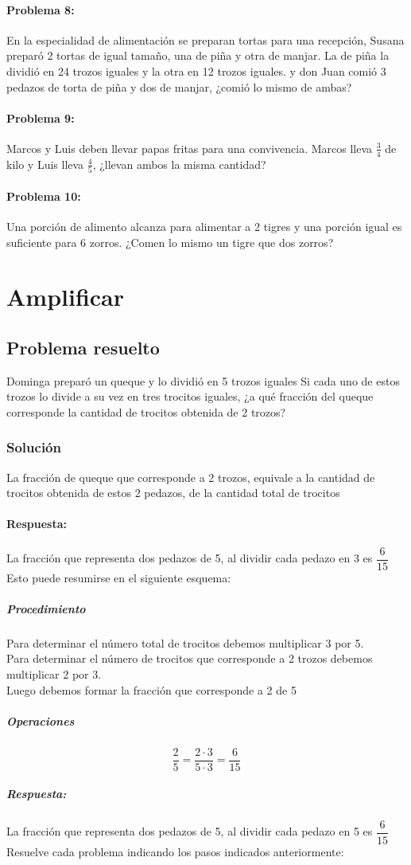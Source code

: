\documentclass[10pt,twoside]{article}
\begin{document}
\paragraph*{Problema 8:} 
En la especialidad de alimentación se preparan tortas para una recepción, Susana preparó 2 tortas de igual tamaño, una de piña y otra de manjar. La de piña la dividió en 24 trozos
iguales y la otra en 12 trozos iguales. y don Juan comió 3 pedazos de torta de piña y dos de manjar, ¿comió lo mismo de ambas?
\paragraph*{Problema 9:}
Marcos y Luis deben llevar papas fritas para una convivencia. Marcos lleva $\frac{3}{4}$ de kilo y Luis lleva $\frac{4}{5}$, ¿llevan ambos la misma cantidad?
\paragraph*{Problema 10:}
Una porción de alimento alcanza para alimentar a 2 tigres y una porción igual es suficiente para 6 zorros. ¿Comen lo mismo un tigre que dos zorros?
\section*{Amplificar}
\subsection*{Problema resuelto}
Dominga preparó un queque y lo dividió en 5 trozos iguales Si cada uno de estos trozos lo divide a su vez en tres trocitos iguales, ¿a qué fracción del queque corresponde la cantidad de trocitos obtenida de 2 trozos?
\subsubsection*{Soluci\'{o}n}
La fracción de queque que corresponde a 2 trozos, equivale a la cantidad de trocitos obtenida de estos 2 pedazos, de la cantidad total de trocitos
\paragraph*{Respuesta:} 
La fracción que representa dos pedazos de 5, al dividir cada pedazo en 3 es $\dfrac{6}{15}$\\
Esto puede resumirse en el siguiente esquema:
\subparagraph*{Procedimiento}
Para determinar el número total de trocitos debemos multiplicar 3 por 5.\\
Para determinar el número de trocitos que corresponde a 2 trozos debemos multiplicar 2 por 3.\\
Luego debemos formar la fracción que corresponde a 2 de 5
\subparagraph*{Operaciones}
\[\dfrac{2}{5}=\dfrac{2\cdot 3}{5\cdot 3}=\dfrac{6}{15}\]
\subparagraph*{Respuesta:}
La fracción que representa dos pedazos de 5, al dividir cada pedazo en 5 es $\dfrac{6}{15}$
Resuelve cada problema indicando los pasos indicados anteriormente:
\end{document}
